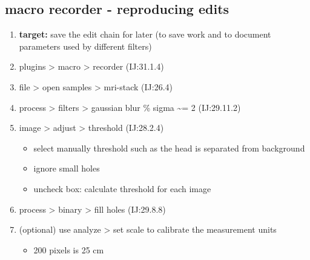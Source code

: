 \documentclass[11pt]{article}
\begin{document}
\subsection{macro recorder - reproducing edits}
\label{sec-7-1}
\begin{enumerate}
\item \textbf{target:} save the edit chain for later (to save work and to
document parameters used by different filters)
\item plugins > macro > recorder (IJ:31.1.4)
\item file > open samples > mri-stack (IJ:26.4)
\item process > filters > gaussian blur \% sigma \textasciitilde{}= 2 (IJ:29.11.2)
\item image > adjust > threshold (IJ:28.2.4)
\begin{itemize}
\item select manually threshold such as the head is separated from background
\item ignore small holes
\item uncheck box: calculate threshold for each image
\end{itemize}
\item process > binary > fill holes (IJ:29.8.8)
\item (optional) use analyze > set scale to calibrate the measurement units
\begin{itemize}
\item 200 pixels is 25 cm
\end{itemize}
\end{enumerate}
\end{document}
